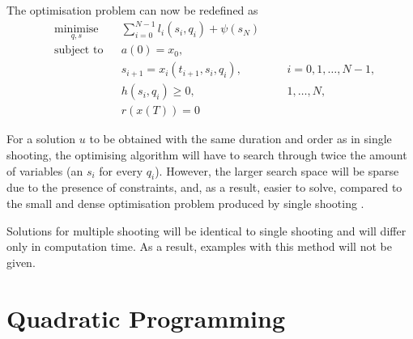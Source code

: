 \par The optimisation problem can now be redefined as
\begin{equation}
    \label{eq:cost_mul_shoot}
    \begin{aligned}
    & \underset{q,s}{\text{minimise}} && \sum_{i=0}^{N-1} l_i(s_i,q_i) + \psi (s_N) \\
    & \text{subject to}  && a(0) = x_0, \\
        & && s_{i+1} = x_i (t_{i+1}, s_i, q_i), &&& i = 0,1,\dots, N-1, \\
        & && h(s_i,q_i) \geq 0, &&& 1,\dots,N, \\
        & && r(x(T)) = 0
    \end{aligned}
\end{equation}

\par For a solution $u$ to be obtained with the same duration and order as in single shooting, the optimising algorithm will have to search through twice the amount of variables (an $s_i$ for every $q_i$). However, the larger search space will be sparse due to the presence of constraints, and, as a result, easier to solve, compared to the small and dense optimisation problem produced by single shooting \cite{rao2009survey}.

\par Solutions for multiple shooting will be identical to single shooting and will differ only in computation time. As a result, examples with this method will not be given.

\section{Quadratic Programming}

